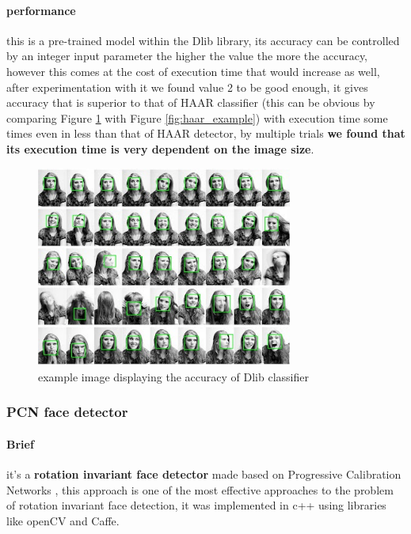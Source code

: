 \paragraph{performance}
this is a pre-trained model within the Dlib library, its accuracy can be controlled by an integer input parameter the higher the value the more the accuracy, however this comes at the cost of execution time that would increase as well, after experimentation with it we found value 2 to be good enough, it gives accuracy that is superior to that of HAAR classifier (this can be obvious by comparing Figure \ref{fig:dlib_example} with Figure \ref{fig:haar_example}) with execution time some times even in less than that of HAAR detector, by multiple trials \textbf{we found that its execution time is very dependent on the image size}.


\begin{figure}
	\centering
	\includegraphics[width=0.75\textwidth]{images/dlib_example.jpg}
	\caption{example image displaying the accuracy of Dlib classifier}
	\label{fig:dlib_example}
\end{figure}

\subsubsection{PCN face detector}
\paragraph{Brief}
it's a \textbf{rotation invariant face detector} made based on Progressive Calibration Networks \cite{PCN}, this approach is one of the most effective approaches to the problem of rotation invariant face detection, it was implemented in c++ using libraries like openCV and Caffe.
